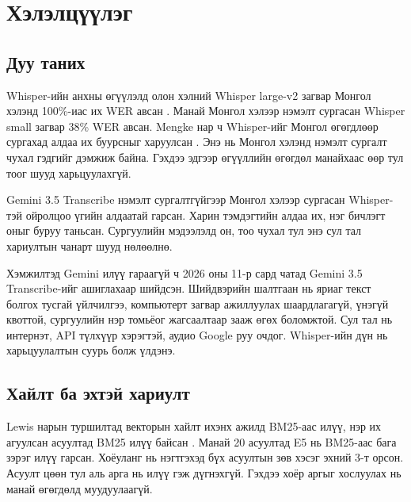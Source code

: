 \chapter{Хэлэлцүүлэг}
\label{ch:discussion}


\section{Дуу таних}
\label{sec:disc-stt}

Whisper-ийн анхны өгүүлэлд олон хэлний Whisper large-v2 загвар Монгол хэлэнд 100\%-иас их WER авсан \cite{radford2023whisper}. Манай Монгол хэлээр нэмэлт сургасан Whisper small загвар 38\% WER авсан. Mengke нар ч Whisper-ийг Монгол өгөгдлөөр сургахад алдаа их буурсныг харуулсан \cite{mengke2025khalkha}. Энэ нь Монгол хэлэнд нэмэлт сургалт чухал гэдгийг дэмжиж байна. Гэхдээ эдгээр өгүүллийн өгөгдөл манайхаас өөр тул тоог шууд харьцуулахгүй.

Gemini 3.5 Transcribe нэмэлт сургалтгүйгээр Монгол хэлээр сургасан Whisper-тэй ойролцоо үгийн алдаатай гарсан. Харин тэмдэгтийн алдаа их, нэг бичлэгт оныг буруу таньсан. Сургуулийн мэдээлэлд он, тоо чухал тул энэ сул тал хариултын чанарт шууд нөлөөлнө.

Хэмжилтэд Gemini илүү гараагүй ч 2026 оны 11-р сард чатад Gemini 3.5 Transcribe-ийг ашиглахаар шийдсэн. Шийдвэрийн шалтгаан нь яриаг текст болгох тусгай үйлчилгээ, компьютерт загвар ажиллуулах шаардлагагүй, үнэгүй квоттой, сургуулийн нэр томьёог жагсаалтаар зааж өгөх боломжтой. Сул тал нь интернэт, API түлхүүр хэрэгтэй, аудио Google руу очдог. Whisper-ийн дүн нь харьцуулалтын суурь болж үлдэнэ.

\section{Хайлт ба эхтэй хариулт}
\label{sec:disc-rag}

Lewis нарын туршилтад векторын хайлт ихэнх ажилд BM25-аас илүү, нэр их агуулсан асуултад BM25 илүү байсан \cite{lewis2020rag}. Манай 20 асуултад E5 нь BM25-аас бага зэрэг илүү гарсан. Хоёуланг нь нэгтгэхэд бүх асуултын зөв хэсэг эхний 3-т орсон. Асуулт цөөн тул аль арга нь илүү гэж дүгнэхгүй. Гэхдээ хоёр аргыг хослуулах нь манай өгөгдөлд муудуулаагүй.

